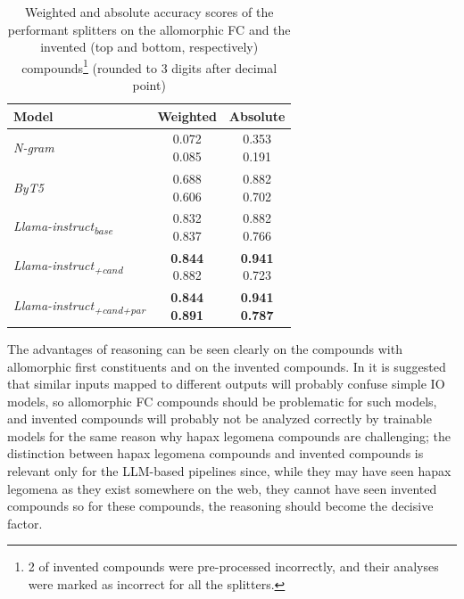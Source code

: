 \documentclass[11pt]{article}
\begin{document}
\begin{table}[htb!]
    \centering
    \renewcommand{\arraystretch}{1.02}
    \begin{tabular}{@{}lcc@{}}
        \toprule
        Model & Weighted & Absolute \\ \midrule
        \textit{N-gram} & \makecell{0.072 \\ 0.085} & \makecell{0.353 \\ 0.191} \\ \cmidrule{1-3}
        \textit{ByT5} & \makecell{0.688 \\ 0.606} & \makecell{0.882 \\ 0.702} \\ \midrule
        \textit{Llama-instruct\textsubscript{base}} & \makecell{0.832 \\ 0.837} & \makecell{0.882 \\ 0.766} & \\
        \textit{Llama-instruct\textsubscript{+cand}} & \makecell{\textbf{0.844} \\ 0.882} & \makecell{\textbf{0.941} \\ 0.723} & \\
        \textit{Llama-instruct\textsubscript{+cand+par}} & \makecell{\textbf{0.844} \\ \textbf{0.891}} & \makecell{\textbf{0.941} \\ \textbf{0.787}} \\ 
        \bottomrule
    \end{tabular}
    \caption{Weighted and absolute accuracy scores of the performant splitters on the allomorphic FC and the invented (top and bottom, respectively) compounds\footnote{2 of invented compounds were pre-processed incorrectly, and their analyses were marked as incorrect for all the splitters.} (rounded to 3 digits after decimal point)}
    \label{tab:allomorphy_scores}
\end{table}

The advantages of reasoning can be seen clearly on the compounds with allomorphic first constituents and on the invented compounds. In  it is suggested that similar inputs mapped to different outputs will probably confuse simple IO models, so allomorphic FC compounds should be problematic for such models, and invented compounds will probably not be analyzed correctly by trainable models for the same reason why hapax legomena compounds are challenging; the distinction between hapax legomena compounds and invented compounds is relevant only for the LLM-based pipelines since, while they may have seen hapax legomena as they exist somewhere on the web, they cannot have seen invented compounds so for these compounds, the reasoning should become the decisive factor.
\end{document}
